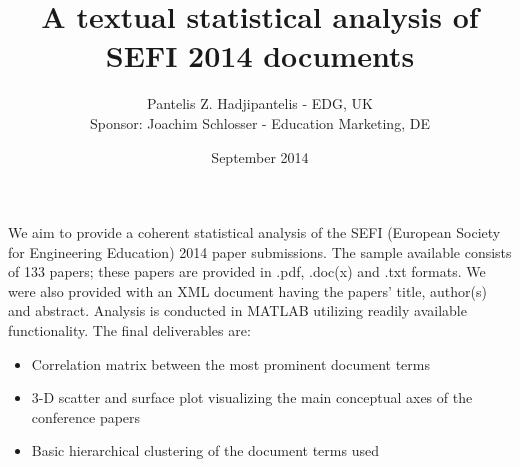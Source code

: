 \documentclass[11pt,english]{article}
\begin{document}
\title{ A textual statistical analysis of SEFI 2014 documents}
\author{ Pantelis Z. Hadjipantelis - EDG, UK \\ Sponsor: Joachim Schlosser - Education Marketing, DE}
\date{September 2014}
\maketitle
\vspace{-.61cm}

We aim to provide a coherent statistical analysis of the SEFI (European Society for Engineering Education) 2014 paper submissions. The sample available consists of 133 papers; these papers are provided in .pdf, .doc(x) and .txt formats. We were also provided with an XML document having the papers' title, author(s) and abstract. Analysis is conducted in MATLAB utilizing readily available functionality. The final deliverables are: \begin{itemize}\item Correlation matrix between the most prominent document terms
\item 3-D scatter and surface plot visualizing the main conceptual axes of the conference papers
\item Basic hierarchical clustering of the document terms used
\end{itemize}
\end{document}
